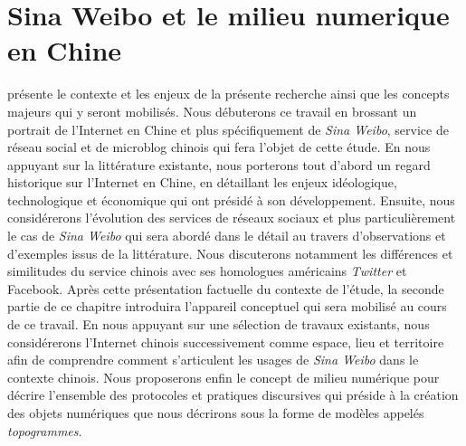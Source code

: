 ﻿\chapter{Sina Weibo et le milieu numerique en Chine} 

 présente le contexte et les enjeux de la présente recherche ainsi que les concepts majeurs qui y seront mobilisés. Nous débuterons ce travail en brossant un portrait de l’Internet en Chine et plus spécifiquement de \textit{Sina Weibo}, service de réseau social et de microblog chinois qui fera l’objet de cette étude. En nous appuyant sur la littérature existante, nous porterons tout d’abord un regard historique sur l’Internet en Chine, en détaillant les enjeux idéologique, technologique et économique qui ont présidé à son développement. Ensuite, nous considérerons l’évolution des services de réseaux sociaux et plus particulièrement le cas de \textit{Sina Weibo} qui sera abordé dans le détail au travers d’observations et d’exemples issus de la littérature. Nous discuterons notamment les différences et similitudes du service chinois avec ses homologues américains \textit{Twitter} et Facebook. Après cette présentation factuelle du contexte de l’étude, la seconde partie de ce chapitre introduira l’appareil conceptuel qui sera mobilisé au cours de ce travail. En nous appuyant sur une sélection de travaux existants, nous considérerons l’Internet chinois successivement comme espace, lieu et territoire afin de comprendre comment s’articulent les usages de \textit{Sina Weibo} dans le contexte chinois. Nous proposerons enfin le concept de milieu numérique pour décrire l’ensemble des protocoles et pratiques discursives qui préside à la création des objets numériques que nous décrirons sous la forme de modèles appelés \textit{topogrammes}.



